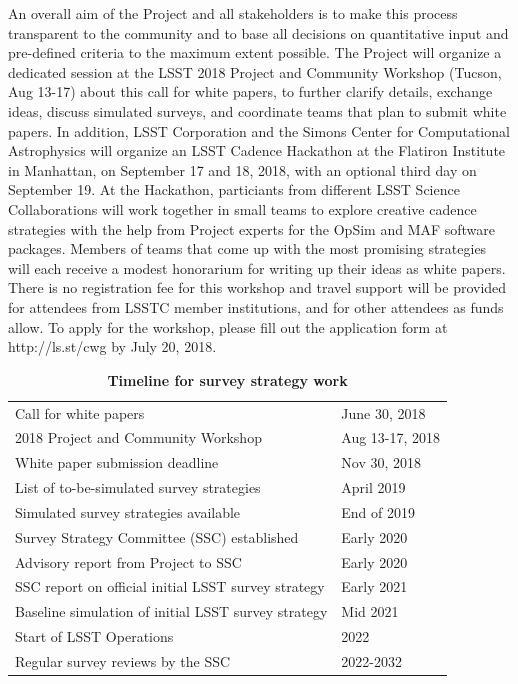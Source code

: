 \documentclass[DM,toc,usenatbib]{lsstdoc}
\begin{document}
An overall aim of the Project and all stakeholders is to make this process transparent to the community and to base 
all decisions on quantitative input and pre-defined criteria to the maximum extent possible. 
The Project will organize a dedicated session at the LSST 2018 Project and Community Workshop (Tucson, Aug 13-17)
about this call for white papers, to further clarify details, exchange ideas, discuss simulated surveys, 
and coordinate teams that plan to submit white papers. 
In addition, LSST Corporation and the Simons Center for Computational Astrophysics
will organize an LSST Cadence Hackathon at the Flatiron Institute in
Manhattan, on September 17 and 18, 2018, with an optional third day on September 19.  
At the Hackathon, particiants from different LSST Science
Collaborations will work together in small teams to explore creative
cadence strategies with the help from Project experts for  the OpSim and MAF
software packages. Members of teams that come up with the most
promising strategies will each receive a modest honorarium for writing
up their ideas as white papers. There is no registration fee for this workshop and 
travel support will be provided for attendees from LSSTC member
institutions, and for other attendees as funds allow.
To apply for the workshop, please fill out the application form at http://ls.st/cwg
by July 20, 2018. 


\begin{table}[htp]
\caption{\bf{Timeline for survey strategy work}}
\begin{center}
\begin{tabular}{l|l}
Call for white papers & June 30, 2018 \\
2018 Project and Community Workshop & Aug 13-17, 2018 \\
White paper submission deadline & Nov 30, 2018 \\
List of to-be-simulated survey strategies & April 2019 \\
Simulated survey strategies available & End of 2019 \\
Survey Strategy Committee (SSC) established & Early 2020 \\
Advisory report from Project to SSC & Early 2020 \\
SSC report on official initial LSST survey strategy & Early 2021 \\
Baseline simulation of initial LSST survey strategy & Mid 2021 \\
Start of LSST Operations & 2022 \\
Regular survey reviews by the SSC & 2022-2032 \\
\end{tabular}
\end{center}
\end{table}
\end{document}
